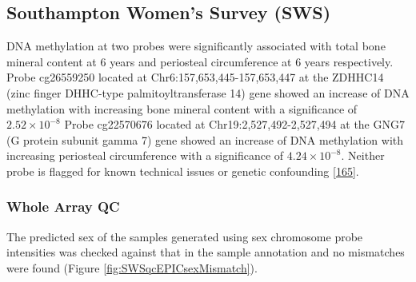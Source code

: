 \documentclass[
]{book}
\begin{document}
\hypertarget{southampton-womens-survey-sws}{%
\subsection{Southampton Women's Survey (SWS)}\label{southampton-womens-survey-sws}}

DNA methylation at two probes were significantly associated with total bone mineral content at 6 years and periosteal circumference at 6 years respectively.
Probe cg26559250 located at Chr6:157,653,445-157,653,447 at the ZDHHC14 (zinc finger DHHC-type palmitoyltransferase 14) gene showed an increase of DNA methylation with increasing bone mineral content with a significance of \(2.52\times 10^{-8}\)
Probe cg22570676 located at Chr19:2,527,492-2,527,494 at the GNG7 (G protein subunit gamma 7) gene showed an increase of DNA methylation with increasing periosteal circumference with a significance of \(4.24\times 10^{-8}\).
Neither probe is flagged for known technical issues or genetic confounding {[}\protect\hyperlink{ref-Zhou2017}{165}{]}.

\hypertarget{whole-array-qc-2}{%
\subsubsection{Whole Array QC}\label{whole-array-qc-2}}

The predicted sex of the samples generated using sex chromosome probe intensities was checked against that in the sample annotation and no mismatches were found (Figure \ref{fig:SWSqcEPICsexMismatch}).
\end{document}
